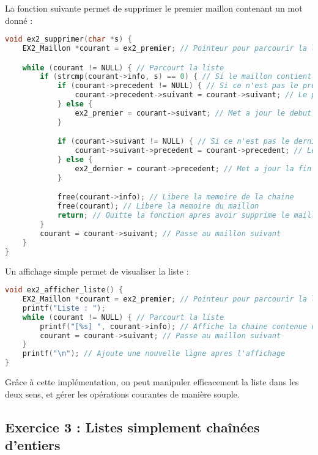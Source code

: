 \documentclass[a4paper,12pt]{article}
\begin{document}
La fonction suivante permet de supprimer le premier maillon contenant un mot donné :

\begin{lstlisting}[language=C, caption={Suppression d'un mot dans la liste}]
void ex2_supprimer(char *s) {
    EX2_Maillon *courant = ex2_premier; // Pointeur pour parcourir la liste

    while (courant != NULL) { // Parcourt la liste
        if (strcmp(courant->info, s) == 0) { // Si le maillon contient la chaine `s`
            if (courant->precedent != NULL) { // Si ce n'est pas le premier maillon
                courant->precedent->suivant = courant->suivant; // Le precedent pointe vers le suivant
            } else {
                ex2_premier = courant->suivant; // Met a jour le debut de la liste
            }

            if (courant->suivant != NULL) { // Si ce n'est pas le dernier maillon
                courant->suivant->precedent = courant->precedent; // Le suivant pointe vers le precedent
            } else {
                ex2_dernier = courant->precedent; // Met a jour la fin de la liste
            }

            free(courant->info); // Libere la memoire de la chaine
            free(courant); // Libere la memoire du maillon
            return; // Quitte la fonction apres avoir supprime le maillon
        }
        courant = courant->suivant; // Passe au maillon suivant
    }
}
\end{lstlisting}

Un affichage simple permet de visualiser la liste :

\begin{lstlisting}[language=C, caption={Affichage de la liste}]
void ex2_afficher_liste() {
    EX2_Maillon *courant = ex2_premier; // Pointeur pour parcourir la liste
    printf("Liste : ");
    while (courant != NULL) { // Parcourt la liste
        printf("[%s] ", courant->info); // Affiche la chaine contenue dans le maillon
        courant = courant->suivant; // Passe au maillon suivant
    }
    printf("\n"); // Ajoute une nouvelle ligne apres l'affichage
}
\end{lstlisting}

Grâce à cette implémentation, on peut manipuler efficacement la liste dans les deux sens, et gérer les opérations courantes de manière souple.


\subsection{Exercice 3 : Listes simplement chaînées d'entiers}
\end{document}
